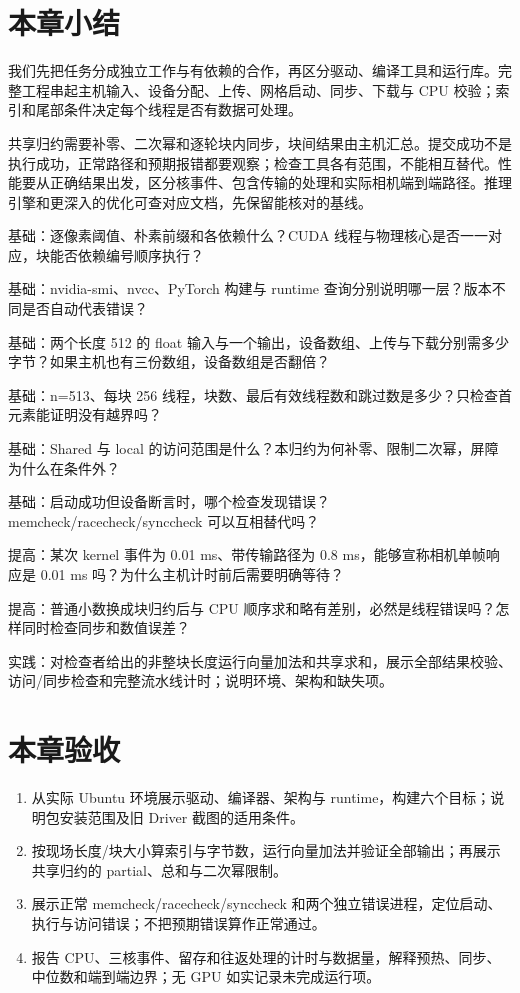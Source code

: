 \section{本章小结}
我们先把任务分成独立工作与有依赖的合作，再区分驱动、编译工具和运行库。完整工程串起主机输入、设备分配、上传、网格启动、同步、下载与 CPU 校验；索引和尾部条件决定每个线程是否有数据可处理。

共享归约需要补零、二次幂和逐轮块内同步，块间结果由主机汇总。提交成功不是执行成功，正常路径和预期报错都要观察；检查工具各有范围，不能相互替代。性能要从正确结果出发，区分核事件、包含传输的处理和实际相机端到端路径。推理引擎和更深入的优化可查对应文档，先保留能核对的基线。

\begin{problemset}
\item\label{prob:v2-cuda-dependency} 基础：逐像素阈值、朴素前缀和各依赖什么？CUDA 线程与物理核心是否一一对应，块能否依赖编号顺序执行？
\item\label{prob:v2-cuda-env} 基础：nvidia-smi、nvcc、PyTorch 构建与 runtime 查询分别说明哪一层？版本不同是否自动代表错误？
\item\label{prob:v2-cuda-memory} 基础：两个长度 512 的 float 输入与一个输出，设备数组、上传与下载分别需多少字节？如果主机也有三份数组，设备数组是否翻倍？
\item\label{prob:v2-cuda-index} 基础：n=513、每块 256 线程，块数、最后有效线程数和跳过数是多少？只检查首元素能证明没有越界吗？
\item\label{prob:v2-cuda-shared} 基础：Shared 与 local 的访问范围是什么？本归约为何补零、限制二次幂，屏障为什么在条件外？
\item\label{prob:v2-cuda-error} 基础：启动成功但设备断言时，哪个检查发现错误？memcheck/racecheck/synccheck 可以互相替代吗？
\item\label{prob:v2-cuda-timing} 提高：某次 kernel 事件为 0.01 ms、带传输路径为 0.8 ms，能够宣称相机单帧响应是 0.01 ms 吗？为什么主机计时前后需要明确等待？
\item\label{prob:v2-cuda-reduction} 提高：普通小数换成块归约后与 CPU 顺序求和略有差别，必然是线程错误吗？怎样同时检查同步和数值误差？
\item\label{prob:v2-cuda-practice} 实践：对检查者给出的非整块长度运行向量加法和共享求和，展示全部结果校验、访问/同步检查和完整流水线计时；说明环境、架构和缺失项。
\end{problemset}

\section{本章验收}
\begin{enumerate}
\item 从实际 Ubuntu 环境展示驱动、编译器、架构与 runtime，构建六个目标；说明包安装范围及旧 Driver 截图的适用条件。
\item 按现场长度/块大小算索引与字节数，运行向量加法并验证全部输出；再展示共享归约的 partial、总和与二次幂限制。
\item 展示正常 memcheck/racecheck/synccheck 和两个独立错误进程，定位启动、执行与访问错误；不把预期错误算作正常通过。
\item 报告 CPU、三核事件、留存和往返处理的计时与数据量，解释预热、同步、中位数和端到端边界；无 GPU 如实记录未完成运行项。
\end{enumerate}
